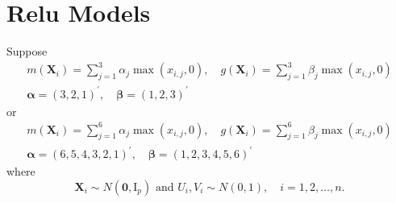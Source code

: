 \documentclass[en,12pt,mtpro2]{elegantpaper}
\begin{document}
\section{Relu Models}

Suppose
\begin{equation}
    \begin{array}{cc}
        m(\mathbf{X}_{i})=\sum_{j=1}^{3}\alpha_{j}\max\left(x_{i,j},0\right),\quad g(\mathbf{X}_{i})=\sum_{j=1}^{3}\beta_{j}\max\left(x_{i,j},0\right) \\
        \boldsymbol{\alpha}=\left(3,2,1\right)^{\prime},\quad\boldsymbol{\beta}=\left(1,2,3\right)^{\prime}
    \end{array}
    \label{eq:relu-model-1}
\end{equation}
or
\begin{equation}
    \begin{array}{cc}
        m(\mathbf{X}_{i})=\sum_{j=1}^{6}\alpha_{j}\max\left(x_{i,j},0\right),\quad g(\mathbf{X}_{i})=\sum_{j=1}^{6}\beta_{j}\max\left(x_{i,j},0\right) \\
        \boldsymbol{\alpha}=\left(6,5,4,3,2,1\right)^{\prime},\quad\boldsymbol{\beta}=\left(1,2,3,4,5,6\right)^{\prime}
    \end{array}
    \label{eq:relu-model-2}
\end{equation}
where
\begin{equation*}
    \mathbf{X}_{i}\sim N\left(\boldsymbol{0},\mathrm{I}_{p}\right)\text{ and }U_{i},V_{i}\sim N\left(0,1\right),\quad i=1,2,\ldots,n.
\end{equation*}
\end{document}

